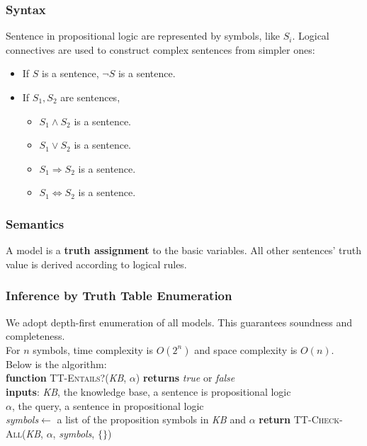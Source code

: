 \documentclass[12pt]{article}
\newcommand{\ind}{\hspace*{15pt}}
\theoremstyle{definition}
\begin{document}
\subsubsection{Syntax}
Sentence in propositional logic are represented by symbols, like $S_i$. Logical connectives are used to construct complex sentences from simpler ones:
\begin{itemize}
	\item If $S$ is a sentence, $\neg S$ is a sentence.
	\item If $S_1, S_2$ are sentences,
	\begin{itemize}
		\item $S_1\land S_2$ is a sentence.
		\item $S_1\lor S_2$ is a sentence.
		\item $S_1\Rightarrow S_2$ is a sentence.
		\item $S_1\Leftrightarrow S_2$ is a sentence.
	\end{itemize}
\end{itemize}
\subsubsection{Semantics}
A model is a \textbf{truth assignment} to the basic variables. All other sentences' truth value is derived according to logical rules.
\subsubsection{Inference by Truth Table Enumeration}
We adopt depth-first enumeration of all models. This guarantees soundness and completeness.\\
For $n$ symbols, time complexity is $O(2^n)$ and space complexity is $O(n)$.\\
Below is the algorithm:\\
\textbf{function} \textsc{TT-Entails?}(\textit{KB}, $\alpha$) \textbf{returns} \textit{true} or \textit{false}\\
\ind \textbf{inputs}: \textit{KB}, the knowledge base, a sentence is propositional logic\\
\ind \ind \ind $\alpha$, the query, a sentence in propositional logic\\

\ind \textit{symbols}$\leftarrow$ a list of the proposition symbols in \textit{KB} and $\alpha$
\ind \textbf{return} \textsc{TT-Check-All}(\textit{KB}, $\alpha$, \textit{symbols}, $\{\}$)\\
\end{document}
